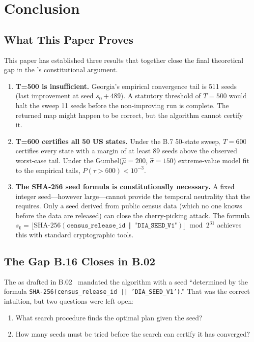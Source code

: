 \section{Conclusion}
\label{sec:conclusion}

\subsection{What This Paper Proves}

This paper has established three results that together close the final
theoretical gap in the \dia{}'s constitutional argument.

\begin{enumerate}
\item \textbf{T=500 is insufficient.}
      Georgia's empirical convergence tail is 511 seeds (last improvement at
      seed $s_0 + 489$).
      A statutory threshold of $T = 500$ would halt the sweep 11 seeds before
      the non-improving run is complete.
      The returned map might happen to be correct, but the algorithm cannot
      certify it.

\item \textbf{T=600 certifies all 50 US states.}
      Under the B.7 50-state sweep, $T = 600$ certifies every state with a
      margin of at least 89 seeds above the observed worst-case tail.
      Under the Gumbel($\hat\mu = 200$, $\hat\sigma = 150$) extreme-value model
      fit to the empirical tails, $P(\tau > 600) < 10^{-3}$.

\item \textbf{The SHA-256 seed formula is constitutionally necessary.}
      A fixed integer seed---however large---cannot provide the temporal
      neutrality that the \dia{} requires.
      Only a seed derived from public census data (which no one knows before
      the data are released) can close the cherry-picking attack.
      The formula $s_0 = \lfloor \mathrm{SHA\text{-}256}(\mathtt{census\_release\_id}
      \,\|\, \texttt{"DIA\_SEED\_V1"}) \rfloor \bmod 2^{31}$
      achieves this with standard cryptographic tools.
\end{enumerate}

\subsection{The Gap B.16 Closes in B.02}

The \dia{} as drafted in B.02~\citep{b02paper} mandated the \ar{} algorithm
with a seed ``determined by the formula
\texttt{SHA-256(census\_release\_id || 'DIA\_SEED\_V1')}.''
That was the correct intuition, but two questions were left open:
\begin{enumerate}
\item What search procedure finds the optimal plan given the seed?
\item How many seeds must be tried before the search can certify it has
      converged?
\end{enumerate}

